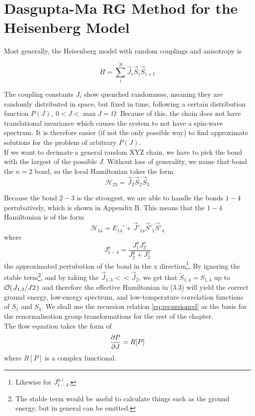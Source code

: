 \documentclass[../sdrg,../../main.tex]{subfiles}
\begin{document}
\section{Dasgupta-Ma RG Method for the Heisenberg Model}
Most generally, the Heisenberg model with random couplings and anisotropy is 

\begin{equation}
    H=\sum_{i}^{N}\vec{J}_{i}\vec{S}_{i}\vec{S}_{i+1}
\end{equation}

The coupling constants $J_{i}$ show quenched randomness, meaning they are randomly distributed in space, but fixed in time, following a certain distribution function $P(J),\ 0<J<\max{J}=\Omega$. Because of this, the chain does not have translational invariance which causes the system to not have a spin-wave spectrum. It is therefore easier (if not the only possible way) to find approximate solutions for the problem of arbitrary $P(J)$.\\

If we want to decimate a general random XYZ chain, we have to pick the bond with the largest of the possible $J$. Without loss of generality, we name that bond the $n=2$ bond, so the local Hamiltonian takes the form
\begin{equation}
    \mathcal{H}_{23}=\vec{J}_{2}\vec{S}_{2}\vec{S}_{3}
\end{equation}

Because the bond $2-3$ is the strongest, we are able to handle the bonds $1-4$ pertubatively, which is shown in Appendix B. This means that the $1-4$ Hamiltonian is of the form
\begin{equation}
    \mathcal{H}_{14}=E_{14}'+\vec{J}'_{14}\vec{S}'_{1}\vec{S}'_{4}
\end{equation}
where 
\begin{equation}
\label{eq:recursionrel}
J_{1-4}^{x}=\frac{J_{1}^{x} J_{3}^{x}}{J_{2}^{y}+J_{2}^{z}}
\end{equation}
the approximated pertubation of the bond in the x direction\footnote{Likewise for $J_{1-4}^{y.z}$.}.
By ignoring the stable term\footnote{The stable term would be useful to calculate things such as the ground energy, but in general can be emitted.}, and by taking the $\vec{J}_{1,3}<<\vec{J}_{2}$, we get that $\tilde{S}_{1,4}=S_{1,4}$ up to $\mathcal{O}(\flatfrac{J_{1,3}}{J{2}})$\cite{fisher} and therefore the effective Hamiltonian in (3.3) will yield the correct ground energy, low-energy spectrum, and low-temperature correlation functions of $S_1$ and $S_4$. We shall use the recursion relation \eqref{eq:recursionrel} as the basis for the renormalisation group transformations for the rest of the chapter.\\


The flow equation takes the form of
\begin{equation}
    \pdv{P}{J}=R[P]
\end{equation}
where $R[P]$ is a complex functional.
\end{document}
